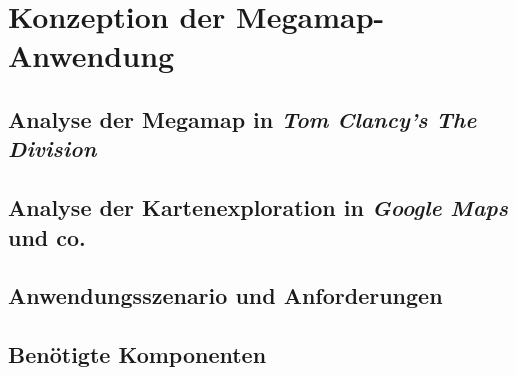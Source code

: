 \chapter{Konzeption der Megamap-Anwendung}

\section{Analyse der Megamap in \emph{Tom Clancy's The Division}}

\section{Analyse der Kartenexploration in \emph{Google Maps} und co.}

\section{Anwendungsszenario und Anforderungen}

\section{Benötigte Komponenten}

%
\cleardoublepage
